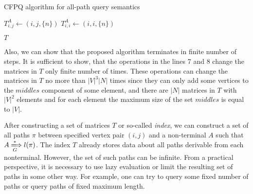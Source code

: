 \begin{algorithm}
	\small
	\begin{algorithmic}[1]
		\caption{CFPQ algorithm for all-path query semantics}
		\label{lst:algo1}
		 \par
		{$T^{A}_{i,j} \gets (i,j,\{n\})$}
		\EndFor
		{$T^{A}_{i,i} \gets (i,i,\{n\})$}
		\EndFor
		
		\EndFor
		\EndWhile
		\State \Return $T$
		\EndFunction
		
	\end{algorithmic}
\end{algorithm}

Also, we can show that the proposed algorithm terminates in finite number of steps. It is sufficient to show, that the operations in the lines 7 and 8 change the matrices in $T$ only finite number of times. These operations can change the matrices in $T$ no more than $|V|^3|N|$ times since they can only add some vertices to the $middles$ component of some element, and there are $|N|$ matrices in $T$ with $|V|^2$ elements and for each element the maximum size of the set $middles$ is equal to $|V|$.



After constructing a set of matrices $T$ or so-called \textit{index}, we can construct a set of all paths $\pi$ between specified vertex pair $(i, j)$ and a non-terminal $A$ such that $A \xLongrightarrow[G]{*} l(\pi)$. The index $T$ already stores data about all paths derivable from each nonterminal. However, the
set of such paths can be infinite. From a practical perspective, it is necessary
to use lazy evaluation or limit the resulting set of paths in some other way.
For example, one can try to query some fixed number of paths or query paths
of fixed maximum length.

